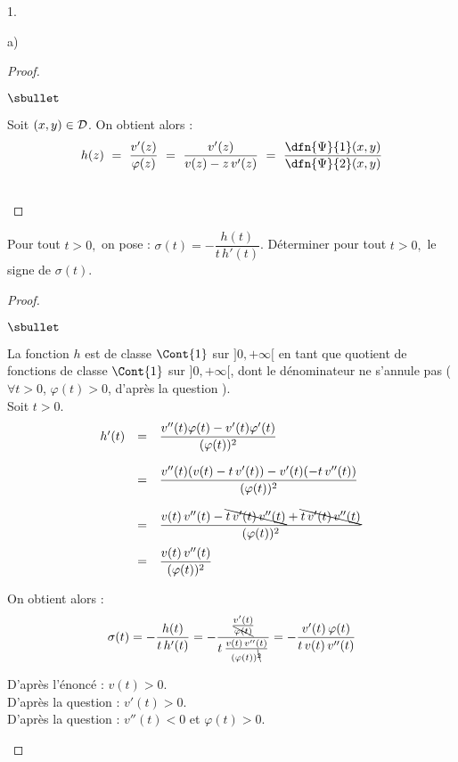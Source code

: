 \documentclass[11pt]{article}%
\begin{document}
\begin{noliste}{1.}
\begin{noliste}{a)}
\begin{proof}
\begin{noliste}{$\sbullet$}
    \item Soit $(x,y) \in {\cal D}$. On obtient alors :
    \[
     h(z) \ = \ \dfrac{v'(z)}{\varphi(z)}
     \ = \ \dfrac{v'(z)}{v(z) - z \, v'(z)}
     \ = \ \dfrac{\dfn{\Psi}{1}(x,y)}{\dfn{\Psi}{2}(x,y)}
    \]
   \end{noliste}
   ~\\[-1cm]
  \end{proof}

  
  \item Pour tout $t>0,$ on pose : $\sigma(t)=-\dfrac{h(t)}{t \, 
  h'(t)}$. Déterminer pour tout $t>0,$ le signe de $\sigma(t)$.
  
  \begin{proof}~
   \begin{noliste}{$\sbullet$}
    \item La fonction $h$ est de classe $\Cont{1}$ sur 
    $]0,+\infty[$ en tant que quotient de fonctions de classe 
    $\Cont{1}$ sur $]0,+\infty[$, dont le dénominateur ne s'annule
    pas
    ($\forall t>0$, $\varphi(t) >0$, d'après la question 
    ).\\
    Soit $t>0$.
    \[
     \begin{array}{rcl}
      h'(t) &=& \dfrac{v''(t) \varphi(t) - v'(t) \varphi'(t)}
      {(\varphi(t))^2}
      \\[.6cm]
      &=& \dfrac{v''(t) (v(t) - t \, v'(t)) 
      - v'(t) (-t \, v''(t))}
      {(\varphi(t))^2}
      \\[.6cm]
      &=& \dfrac{v(t) \, v''(t) - \bcancel{t \, v'(t) \, v''(t)} 
      + \bcancel{t \, v'(t) \, v''(t)}}
      {(\varphi(t))^2}
      \\[.4cm]
      &=& \dfrac{v(t) \, v''(t)}{(\varphi(t))^2}
     \end{array}
    \]
    
    \item On obtient alors :
    \[
     \sigma(t) = - \dfrac{h(t)}{t\, h'(t)} = -
     \dfrac{\frac{v'(t)}{\bcancel{\varphi(t)}}}
     {t \, \frac{v(t) \, v''(t)}{(\varphi(t))^{\bcancel{2}}}}
     = - \dfrac{v'(t) \, \varphi(t)}
     {t \, v(t) \, v''(t)}
    \]

    \item D'après l'énoncé : $v(t) >0$.\\
    D'après la question  : $v'(t)>0$.\\
    D'après la question  : $v''(t)<0$ et
    $\varphi(t) >0$.
    ~\\[-1.4cm]
   \end{noliste}
  \end{proof}
 \end{noliste}
 

\end{noliste}
\end{document}

